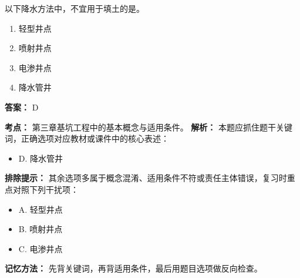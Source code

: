 \documentclass[UTF8,fontset=fandol,11pt]{ctexart}
\begin{document}
\vspace{0.2em}

\begin{quizbox}[title={第 13 题}]
以下降水方法中，不宜用于填土的是。\\
\begin{enumerate}[label=\Alph*.]
\item 轻型井点
\item 喷射井点
\item 电渗井点
\item 降水管井
\end{enumerate}
\textbf{答案：} D
\vspace{0.25em}
\begin{answerbox}[title={考点解析}]
\textbf{考点：} 第三章基坑工程中的基本概念与适用条件。
\textbf{解析：} 本题应抓住题干关键词，正确选项对应教材或课件中的核心表述：
\begin{itemize}
\item D. 降水管井
\end{itemize}
\textbf{排除提示：} 其余选项多属于概念混淆、适用条件不符或责任主体错误，复习时重点对照下列干扰项：
\begin{itemize}
\item A. 轻型井点
\item B. 喷射井点
\item C. 电渗井点
\end{itemize}
\textbf{记忆方法：} 先背关键词，再背适用条件，最后用题目选项做反向检查。
\end{answerbox}
\end{quizbox}

\vspace{0.2em}
\end{document}
